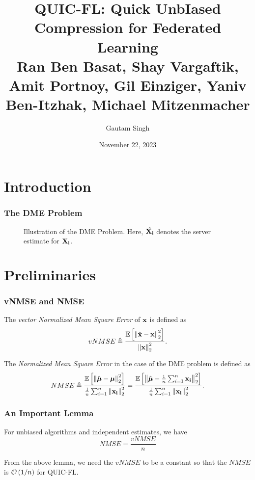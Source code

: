 \documentclass{beamer}
\title[QUIC-FL]{QUIC-FL: Quick UnbIased Compression for Federated Learning\\
\small Ran Ben Basat, Shay Vargaftik, Amit Portnoy, Gil Einziger, Yaniv Ben-Itzhak, Michael Mitzenmacher}
\date{November 22, 2023}
\author{Gautam Singh}
\institute[]{Indian Institute of Technology Hyderabad}
\begin{document}
    \maketitle
    \tableofcontents
    \section{Introduction}

    \begin{frame}
        \frametitle{The DME Problem}
        \begin{figure}[!ht]
            
            \caption{Illustration of the DME Problem. Here, \(\hat{\boldsymbol{\mathbf{X_i}}}\)
            denotes the server estimate for \(\boldsymbol{\mathbf{X_i}}\).} 
            \label{fig:dme}
        \end{figure}
    \end{frame}

    \section{Preliminaries}
    \begin{frame}
        \frametitle{vNMSE and NMSE}
        \begin{definition}[vNMSE]
        The \emph{vector Normalized Mean Square Error} of \(\boldsymbol{\mathbf{x}}\)
        is defined as
        \begin{equation}
            vNMSE \triangleq \frac{\mathbb{E}\left[ \left\lVert\hat{\boldsymbol{\mathbf{x}}}-\boldsymbol{\mathbf{x}}\right\rVert^2_2 \right]}{\left\lVert\boldsymbol{\mathbf{x}}\right\rVert^2_2}.
            \label{eq:vnmse-def}
        \end{equation}
        \end{definition}
        \begin{definition}[NMSE]
        The \emph{Normalized Mean Square Error} in the case of the DME
        problem is defined as
        \begin{equation}
            NMSE \triangleq \frac{\mathbb{E}\left[ \left\lVert\hat{\boldsymbol{\mathbf{\mu}}}-\boldsymbol{\mathbf{\mu}}\right\rVert^2_2 \right]}{\frac{1}{n}\sum_{i=1}^n\left\lVert\boldsymbol{\mathbf{x_i}}\right\rVert^2_2} = \frac{\mathbb{E}\left[ \left\lVert\hat{\boldsymbol{\mathbf{\mu}}}-\frac{1}{n}\sum_{i=1}^n\boldsymbol{\mathbf{x_i}}\right\rVert^2_2 \right]}{\frac{1}{n}\sum_{i=1}^n\left\lVert\boldsymbol{\mathbf{x_i}}\right\rVert^2_2}.
            \label{eq:nmse-def}
        \end{equation}
        \end{definition}
    \end{frame}

    \begin{frame}
        \frametitle{An Important Lemma}
        \begin{lemma}
            \label{lem:vnmse-nmse-rel}
            For unbiased algorithms and independent estimates, we have
            \begin{equation}
                NMSE = \frac{vNMSE}{n}
            \end{equation}
        \end{lemma}
        From the above lemma, we need the \(vNMSE\) to be a constant so that the
        \(NMSE\) is \(\mathcal O\left(1/n\right)\) for QUIC-FL.
    \end{frame}
\end{document}
